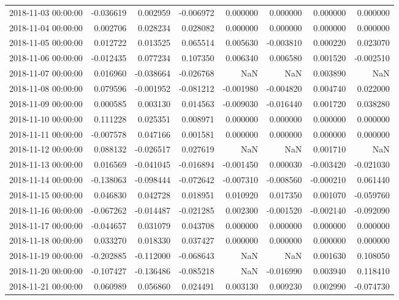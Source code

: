 \begin{tabular}{lrrrrrrr}
2018-11-03 00:00:00 & -0.036619 & 0.002959 & -0.006972 & 0.000000 & 0.000000 & 0.000000 & 0.000000 \\
2018-11-04 00:00:00 & 0.002706 & 0.028234 & 0.028082 & 0.000000 & 0.000000 & 0.000000 & 0.000000 \\
2018-11-05 00:00:00 & 0.012722 & 0.013525 & 0.065514 & 0.005630 & -0.003810 & 0.000220 & 0.023070 \\
2018-11-06 00:00:00 & -0.012435 & 0.077234 & 0.107350 & 0.006340 & 0.006580 & 0.001520 & -0.002510 \\
2018-11-07 00:00:00 & 0.016960 & -0.038664 & -0.026768 & NaN & NaN & 0.003890 & NaN \\
2018-11-08 00:00:00 & 0.079596 & -0.001952 & -0.081212 & -0.001980 & -0.004820 & 0.004740 & 0.022000 \\
2018-11-09 00:00:00 & 0.000585 & 0.003130 & 0.014563 & -0.009030 & -0.016440 & 0.001720 & 0.038280 \\
2018-11-10 00:00:00 & 0.111228 & 0.025351 & 0.008971 & 0.000000 & 0.000000 & 0.000000 & 0.000000 \\
2018-11-11 00:00:00 & -0.007578 & 0.047166 & 0.001581 & 0.000000 & 0.000000 & 0.000000 & 0.000000 \\
2018-11-12 00:00:00 & 0.088132 & -0.026517 & 0.027619 & NaN & NaN & 0.001710 & NaN \\
2018-11-13 00:00:00 & 0.016569 & -0.041045 & -0.016894 & -0.001450 & 0.000030 & -0.003420 & -0.021030 \\
2018-11-14 00:00:00 & -0.138063 & -0.098444 & -0.072642 & -0.007310 & -0.008560 & -0.000210 & 0.061440 \\
2018-11-15 00:00:00 & 0.046830 & 0.042728 & 0.018951 & 0.010920 & 0.017350 & 0.001070 & -0.059760 \\
2018-11-16 00:00:00 & -0.067262 & -0.014487 & -0.021285 & 0.002300 & -0.001520 & -0.002140 & -0.092090 \\
2018-11-17 00:00:00 & -0.044657 & 0.031079 & 0.043708 & 0.000000 & 0.000000 & 0.000000 & 0.000000 \\
2018-11-18 00:00:00 & 0.033270 & 0.018330 & 0.037427 & 0.000000 & 0.000000 & 0.000000 & 0.000000 \\
2018-11-19 00:00:00 & -0.202885 & -0.112000 & -0.068643 & NaN & NaN & 0.001630 & 0.108050 \\
2018-11-20 00:00:00 & -0.107427 & -0.136486 & -0.085218 & NaN & -0.016990 & 0.003940 & 0.118410 \\
2018-11-21 00:00:00 & 0.060989 & 0.056860 & 0.024491 & 0.003130 & 0.009230 & 0.002990 & -0.074730 \\

\end{tabular}
